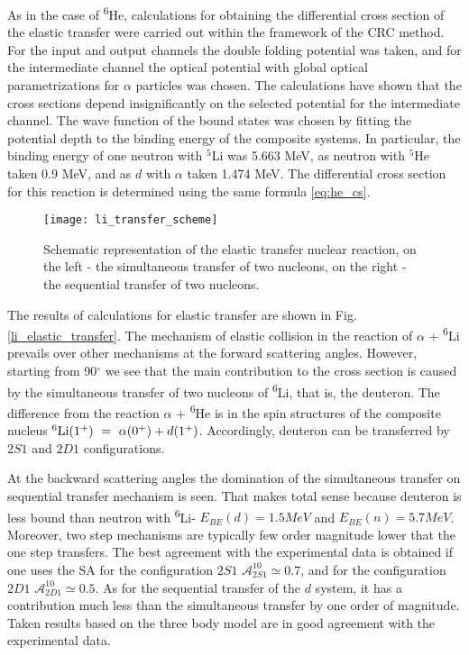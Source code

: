 \documentclass[
12pt, %
oneside, %
english, %
onehalfspacing, %
onehalfspacing, %
headsepline, %
]{MastersDoctoralThesis} %
\newcommand{\he}{\textsuperscript{6}He\xspace}
\newcommand{\li}{\textsuperscript{6}Li\xspace}
\begin{document}
As in the case of \he, calculations for obtaining the differential cross section of the elastic transfer were carried out within the framework of the CRC method. 
For the input and output channels the double folding potential was taken, and for the intermediate channel the optical potential with global optical parametrizations for $\alpha$ particles \cite{avrigeanu1994global}  was chosen. 
The calculations have shown that the cross sections depend insignificantly on the selected potential for the intermediate channel. 
The wave function of the bound states was chosen by fitting the potential depth to the binding energy of the composite systems. 
In particular, the binding energy of one neutron with $^5$Li was 5.663 MeV, as neutron with $^5$He taken 0.9 MeV, and as $d$ with  $\alpha$  taken 1.474 MeV. 
The differential cross section for this reaction is determined using the same formula \ref{eq:he_cs}.

\begin{figure}[tp!]
\centering
\texttt{[image: li\_transfer\_scheme]}
\decoRule
\caption{  \footnotesize  Schematic representation of the elastic transfer nuclear reaction, on the left - the simultaneous transfer of two nucleons, on the right - the sequential transfer of two nucleons.
}
\label{li_transfer_scheme}
\end{figure}

The results of calculations for elastic transfer are shown in Fig. \ref{li_elastic_transfer}. 
The mechanism of elastic collision in the reaction of $\alpha$ + \li   prevails over other mechanisms at the forward scattering angles. 
However, starting from 90$^\circ$ we see that the main contribution to the cross section is caused by the simultaneous transfer of two nucleons of  \li, that is, the deuteron. 
The difference from the reaction $ \alpha $ + \he is in the spin structures of the composite nucleus ${\rm \li}(1^+)~=~ \alpha (0^+) + d (1^+) $. Accordingly, deuteron can be transferred by $2S1$ and $2D1$ configurations.

At the backward scattering angles the domination of the simultaneous  transfer on sequential transfer mechanism is seen. That makes total sense because deuteron is less bound than neutron with \li - $E_{BE}(d)=1.5 MeV$ and  $E_{BE}(n)=5.7 MeV$. Moreover, two step mechanisms are typically few order magnitude lower that the one step transfers. 
The best agreement with the experimental data is obtained if one uses the SA for the configuration $2S1$ $ \mathcal {A}^{10} _ {2S1} \simeq 0.7 $, and for the configuration $2D1$ $ \mathcal{A}^ {10}_{2D1} \simeq 0.5 $. 
As for the sequential transfer of the $d$ system, it has a contribution much less than the simultaneous transfer by one order of magnitude. 
Taken results based on the three body model are in good agreement with the experimental data.
\end{document}
